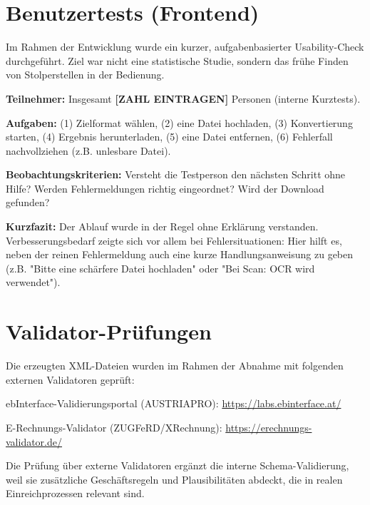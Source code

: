 \section{Benutzertests (Frontend)}
\label{app:usability_test}

Im Rahmen der Entwicklung wurde ein kurzer, aufgabenbasierter Usability-Check durchgeführt. Ziel war nicht eine statistische Studie, sondern das frühe Finden von Stolperstellen in der Bedienung.

\textbf{Teilnehmer:} Insgesamt \textbf{[ZAHL EINTRAGEN]} Personen (interne Kurztests).

\textbf{Aufgaben:} (1) Zielformat wählen, (2) eine Datei hochladen, (3) Konvertierung starten, (4) Ergebnis herunterladen, (5) eine Datei entfernen, (6) Fehlerfall nachvollziehen (z.B. unlesbare Datei).

\textbf{Beobachtungskriterien:} Versteht die Testperson den nächsten Schritt ohne Hilfe? Werden Fehlermeldungen richtig eingeordnet? Wird der Download gefunden?

\textbf{Kurzfazit:} Der Ablauf wurde in der Regel ohne Erklärung verstanden. Verbesserungsbedarf zeigte sich vor allem bei Fehlersituationen: Hier hilft es, neben der reinen Fehlermeldung auch eine kurze Handlungsanweisung zu geben (z.B. "Bitte eine schärfere Datei hochladen" oder "Bei Scan: OCR wird verwendet").

\section{Validator-Prüfungen}
\label{app:validatoren}

Die erzeugten XML-Dateien wurden im Rahmen der Abnahme mit folgenden externen Validatoren geprüft:
\begin{compactitem}
	\item ebInterface-Validierungsportal (AUSTRIAPRO): \url{https://labs.ebinterface.at/}
	\item E-Rechnungs-Validator (ZUGFeRD/XRechnung): \url{https://erechnungs-validator.de/}
\end{compactitem}

Die Prüfung über externe Validatoren ergänzt die interne Schema-Validierung, weil sie zusätzliche Geschäftsregeln und Plausibilitäten abdeckt, die in realen Einreichprozessen relevant sind.
